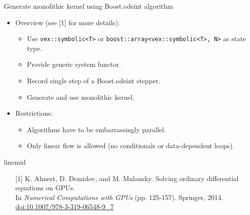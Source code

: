 \documentclass[@BEAMER_OPTIONS@]{beamer}
\newcommand{\code}[1]{\lstinline|#1|}
\newcommand{\footnoteline}{\begin{beamercolorbox}[wd=\textwidth,ht=.1ex,dp=0ex]{linemid}\end{beamercolorbox}}
\begin{document}

\begin{frame}[fragile]{Generate monolithic kernel using Boost.odeint algorithm}
    \begin{itemize}
        \item Overview (see \alert{[1]} for more details):
        \begin{itemize}
            \item Use \code{vex::symbolic<T>} or
                \code{boost::array<vex::symbolic<T>, N>} as state type.
            \item Provide generic system functor.
            \item Record single step of a Boost.odeint stepper.
            \item Generate and use monolithic kernel. 
        \end{itemize}
        \vspace{\baselineskip}
    \item<2> Restrictions:
        \begin{itemize}
            \item Algorithms have to be embarrassingly parallel.
            \item Only linear flow is allowed (no conditionals or
                data-dependent loops).
        \end{itemize}
    \end{itemize}
    \footnoteline
    \begin{footnotesize}
        \begin{itemize}
            \item[{[1]}] K. Ahnert, D. Demidov, and M. Mulansky.  Solving
                ordinary differential equations on GPUs.\\
                In \emph{Numerical Computations with GPUs} (pp. 125-157).
                Springer, 2014.
                \href{http://dx.doi.org/10.1007/978-3-319-06548-9\_7}{doi:10.1007/978-3-319-06548-9\_7}
        \end{itemize}
    \end{footnotesize}
\end{frame}
\end{document}
